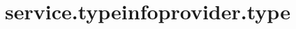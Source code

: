\section{service.typeinfoprovider.type}
\label{configuration:ServiceTypeinfoproviderType}
\AvailableInJavaOnly{\TODO}
